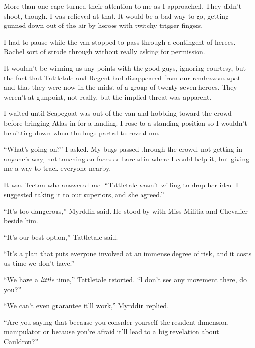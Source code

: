 More than one cape turned their attention to me as I approached.  They didn't shoot, though.  I was relieved at that.  It would be a bad way to go, getting gunned down out of the air by heroes with twitchy trigger fingers.



I had to pause while the van stopped to pass through a contingent of heroes.  Rachel sort of strode through without really asking for permission.



It wouldn't be winning us any points with the good guys, ignoring courtesy, but the fact that Tattletale and Regent had disappeared from our rendezvous spot and that they were now in the midst of a group of twenty-seven heroes.  They weren't at gunpoint, not really, but the implied threat was apparent.



I waited until Scapegoat was out of the van and hobbling toward the crowd before bringing Atlas in for a landing.  I rose to a standing position so I wouldn't be sitting down when the bugs parted to reveal me.



``What's going on?'' I asked.  My bugs passed through the crowd, not getting in anyone's way, not touching on faces or bare skin where I could help it, but giving me a way to track everyone nearby.



It was Tecton who answered me.  ``Tattletale wasn't willing to drop her idea.  I suggested taking it to our superiors, and she agreed.''



``It's too dangerous,'' Myrddin said.  He stood by with Miss Militia and Chevalier beside him.



``It's our best option,'' Tattletale said.



``It's a plan that puts everyone involved at an immense degree of risk, and it costs us time we don't have.''



``We have a \emph{little} time,'' Tattletale retorted.  ``I don't see any movement there, do you?''



``We can't even guarantee it'll work,'' Myrddin replied.



``Are you saying that because you consider yourself the resident dimension manipulator or because you're afraid it'll lead to a big revelation about Cauldron?''



